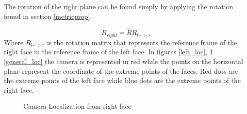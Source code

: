 \documentclass[11pt, oneside]{article}   	%
\begin{document}
The rotation of the right plane can be found simply by applying the rotation found in section \ref{metricprop}.


$$
R_{right} = \hat{R}R_{l->r}
$$
Where $R_{l->r}$ is the rotation matrix that represents the reference frame of the right face in the reference frame of the left face.
In figures \ref{left_loc}, \ref{right_loc} \ref{general_loc} the camera is represented in red while the points on the horizontal plane represent the coordinate of the extreme points of the faces. Red dots are the extreme points of the left face while blue dots are the extreme points of the right face. 

\begin{figure}[H]
 \centering
    \qquad
        \qquad
    \caption{Camera Localization from right face}%
    \label{right_loc}%
\end{figure}
\end{document}
